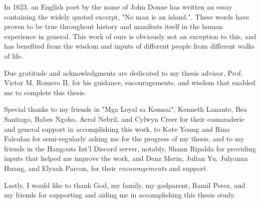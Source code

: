 
In 1623, an English poet by the name of John Donne has written an essay containing the widely quoted excerpt, "No man is an island.". These words have proven to be true throughout history and manifests itself in the human experience in general. This work of ours is obviously not an exception to this, and has benefited from the wisdom and inputs of different people from different walks of life.

Due gratitude and acknowledgments are dedicated to my thesis advisor, Prof. Victor M. Romero II, for his guidance, encouragements, and wisdom that enabled me to complete this thesis.

Special thanks to my friends in "Mga Loyal sa Komsai", Kenneth Lanante, Bea Santiago, Babes Ngoho, Aerol Nebril, and Cylwyn Creer for their comaraderie and general support in accomplishing this work, to Kate Young and Rina Falculan for semi-regularly asking me for the progress of my thesis, and to my friends in the Hangouts Int'l Discord server, notably, Shann Ripalda for providing inputs that helped me improve the work, and Denz Merin, Julian Yu, Julyanna Huang, and Elyzah Parcon, for their \textit{encouragements} and support.

Lastly, I would like to thank God, my family, my godparent, Ramil Perez, and my friends for supporting and aiding me in accomplishing this thesis study.


